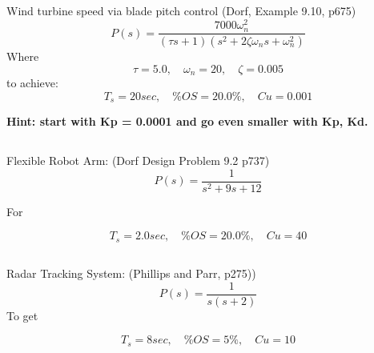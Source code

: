 \documentclass{article}	%
\begin{document}
\subsection{}
Wind turbine speed via blade pitch control (Dorf, Example 9.10, p675)
\[
P(s) = \frac {7000\omega_n^2} {(\tau s + 1)(s^2+2\zeta\omega_ns + \omega_n^2)}
\]
Where
\[
\tau = 5.0, \quad \omega_n = 20, \quad \zeta = 0.005
\]
to achieve:
\[
T_s =  20 sec, \quad \%OS = 20.0\%, \quad Cu = 0.001
\]


{\bf   Hint: start with Kp = 0.0001 and go even smaller with Kp, Kd. }

%
%
%
%
%
%
%
%
%
%
%
\subsection{}
Flexible Robot Arm: (Dorf Design Problem 9.2 p737)
\[
P(s) =   \frac {1}{s^2 + 9s + 12}
\]

For

\[
T_s =  2.0 sec, \quad \%OS = 20.0\%, \quad Cu = 40
\]

%
%
%
%
%
%
%
%
%
%
\subsection{}
Radar Tracking System: (Phillips and Parr, p275))
\[
P(s) = \frac{1}{s(s+2)}
\]
To get

\[
T_s =  8 sec, \quad \%OS = 5\%, \quad Cu = 10
\]

%
%
%
%
%
%
%
%
%
%
%
\end{document}
